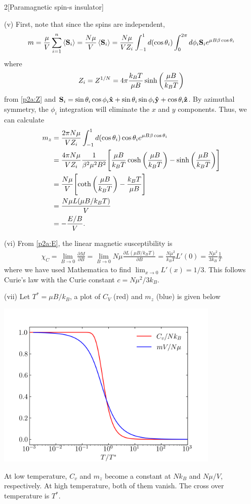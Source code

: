 \documentclass[12pt]{article}
\begin{document}
\begin{problem}{2}[Paramagnetic spin-s insulator]
\begin{solution}
(v) First, note that since the spins are independent,
\begin{equation}
    m=\frac{\mu}{V}\sum_{i=1}^n\expval{\vb{S}_i} 
    =\frac{N\mu}{V}\expval{\vb{S}_i}
    =\frac{N\mu}{VZ_i}\int_{-1}^1d(\cos\theta_i)\int_0^{2\pi}d\phi_i\vb{S}_ie^{\mu
    B\beta\cos\theta_i}
\end{equation}
where
\begin{equation}
    Z_i=Z^{1/N}=4\pi\frac{k_BT}{\mu B}\sinh\qty(\frac{\mu B}{k_BT}) 
\end{equation}
from \eqref{p2a:Z} and
$\vb{S}_i=\sin\theta_i\cos\phi_i\vb{\hat{x}}+\sin\theta_i\sin\phi_i\vb{\hat{y}}+\cos\theta_i\vb{\hat{z}}$.
By azimuthal symmetry, the $\phi_i$ integration will eliminate the $x$ and $y$
components. Thus, we can calculate
\begin{align}
    m_z
    &=\frac{2\pi N\mu}{VZ_i}\int_{-1}^1d(\cos\theta_i)\cos\theta_i e^{\mu
    B\beta\cos\theta_i}\notag\\
    &=\frac{4\pi N\mu}{VZ_i}\frac{1}{\beta^2\mu^2B^2}\qty[\frac{\mu
    B}{k_BT}\cosh\qty(\frac{\mu B}{k_BT})-\sinh\qty(\frac{\mu B}{k_BT})]\notag\\
    &=\frac{N\mu}{V}\qty[\coth\qty(\frac{\mu B}{k_BT})-\frac{k_BT}{\mu
    B}]\notag\\
    &=\frac{N\mu L(\mu B/k_BT)}{V}\notag\\
    &=-\frac{E/B}{V}.
\end{align}

(vi) From \eqref{p2a:E}, the linear magnetic susceptibility is
\begin{align}
    \chi_C
    =\lim_{B\to0}\frac{\partial M}{\partial B}
    =\lim_{B\to0}N\mu\frac{\partial L(\mu B/k_BT)}{\partial B}
    =\frac{N\mu^2}{k_BT}L'(0)
    =\frac{N\mu^2}{3k_B}\frac1T
\end{align}
where we have used Mathematica to find $\lim_{x\to 0}L'(x)=1/3$. This follows
Curie's law with the Curie constant $c=N\mu^2/3k_B$.

(vii) Let $T^\ast=\mu B/k_B$, a plot of $C_V$ (red) and $m_z$ (blue) is given
below
\begin{center}
    \includegraphics[width=0.8\textwidth]{p2avii.png} 
\end{center}
At low temperature, $C_v$ and $m_z$ become a constant at $Nk_B$ and $N\mu/V$,
respectively. At high temperature, both of them vanish. The cross over
temperature is $T^\ast$.


\end{solution}
\end{problem}
\end{document}
